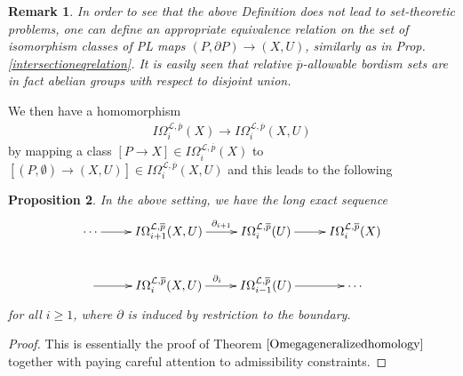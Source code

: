 \documentclass{scrreprt}
\newtheorem{prop}{Proposition}[chapter]
\newtheorem{remark}[prop]{Remark}
\begin{document}
\begin{remark}
In order to see that the above Definition does not lead to set-theoretic problems, one can define an appropriate equivalence relation on the set of isomorphism classes of PL maps $(P, \partial P) \to (X,U)$, similarly as in Prop.\ref{intersectioneqrelation}. It is easily seen that relative $\overline{p}$-allowable bordism sets are in fact abelian groups with respect to disjoint union.
\end{remark}
We then have a homomorphism
\begin{align*}
I\Omega_i^{\mathcal{L},\overline{p}}(X) \to I\Omega_i^{\mathcal{L},\overline{p}}(X,U)
\end{align*}
by mapping a class $[P \to X] \in I\Omega_i^{\mathcal{L},\overline{p}}(X)$ to $[(P,\emptyset) \to (X,U)] \in I\Omega_i^{\mathcal{L},\overline{p}}(X,U)$ and this leads to the following 
\begin{prop}
In the above setting, we have the long exact sequence
\begin{equation*}
\begin{xy}
\xymatrix{ 
\cdots \ar[r]^{}     &   I\Omega_{i+1}^{\mathcal{L},\overline{p}}(X,U) \ar[r]^{\ \ \partial_{i+1}}    &   I\Omega_i^{\mathcal{L},\overline{p}}(U) \ar[r]^{}   &  I\Omega_i^{\mathcal{L},\overline{p}}(X) \\
  \ar[r]^{}   &   I\Omega_i^{\mathcal{L},\overline{p}}(X,U)  \ar[r]^{\partial_i}   &  I\Omega_{i-1}^{\mathcal{L},\overline{p}}(U) \ar[r]^{}   &   \cdots
}
\end{xy}
\end{equation*}
for all $i \geq 1$, where $\partial$ is induced by restriction to the boundary.
\end{prop}

\begin{proof}
This is essentially the proof of Theorem $\ref{Omegageneralizedhomology}$ together with paying careful attention to admissibility constraints.
\end{proof}
\end{document}
